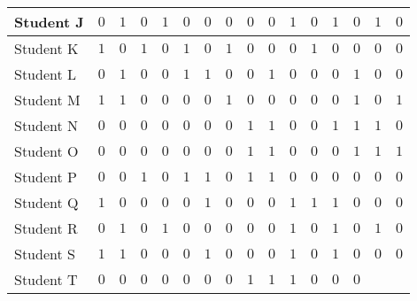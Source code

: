 \documentclass[11pt]{article}
\begin{document}
\begin{table}[h]
\begin{tabular}{|a||l|l|l|l|l|l|l|l|l|l|l|l|l|l|l|}
Student J & $0$ & $1$ & $0$ & $1$ & $0$ & $0$
& $0$ & $0$ & $0$ & $1$ & $0$ & $1$ & $0$
& $1$ & $0$ \\ \hline
Student K & $1$ & $0$ & $1$ & $0$ & $1$ & $0$
& $1$ & $0$ & $0$ & $0$ & $1$ & $0$ & $0$
& $0$ & $0$ \\ \hline
Student L & $0$ & $1$ & $0$ & $0$ & $1$ & $1$
& $0$ & $0$ & $1$ & $0$ & $0$ & $0$ & $1$
& $0$ & $0$ \\ \hline
Student M & $1$ & $1$ & $0$ & $0$ & $0$ & $0$
& $1$ & $0$ & $0$ & $0$ & $0$ & $0$ & $1$
& $0$ & $1$ \\ \hline
Student N & $0$ & $0$ & $0$ & $0$ & $0$ & $0$
& $0$ & $1$ & $1$ & $0$ & $0$ & $1$ & $1$
& $1$ & $0$ \\ \hline
Student O & $0$ & $0$ & $0$ & $0$ & $0$ & $0$
& $0$ & $1$ & $1$ & $0$ & $0$ & $0$ & $1$
& $1$ & $1$ \\ \hline
Student P & $0$ & $0$ & $1$ & $0$ & $1$ & $1$
& $0$ & $1$ & $1$ & $0$ & $0$ & $0$ & $0$
& $0$ & $0$ \\ \hline
Student Q & $1$ & $0$ & $0$ & $0$ & $0$ & $1$
& $0$ & $0$ & $0$ & $1$ & $1$ & $1$ & $0$
& $0$ & $0$ \\ \hline
Student R & $0$ & $1$ & $0$ & $1$ & $0$ & $0$
& $0$ & $0$ & $0$ & $1$ & $0$ & $1$ & $0$
& $1$ & $0$ \\ \hline
Student S & $1$ & $1$ & $0$ & $0$ & $0$ & $1$
& $0$ & $0$ & $0$ & $1$ & $0$ & $1$ & $0$
& $0$ & $0$ \\ \hline
Student T & $0$ & $0$ & $0$ & $0$ & $0$ & $0$
& $0$ & $1$ & $1$ & $1$ & $0$ & $0$ & $0$

\end{tabular}
\end{table}
\end{document}
